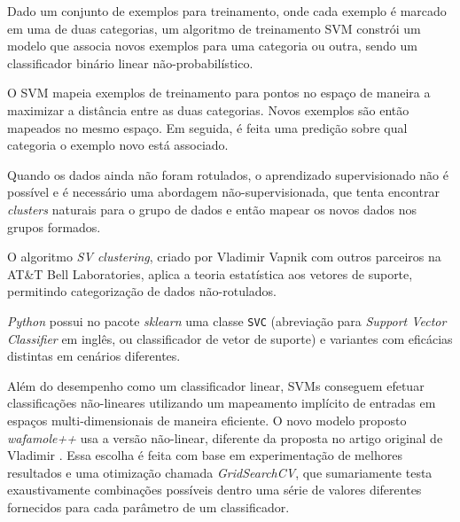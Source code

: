 Dado um conjunto de exemplos para treinamento, onde cada exemplo é marcado em uma de duas categorias, um algoritmo de treinamento SVM constrói um modelo que associa novos exemplos para uma categoria ou outra, sendo um classificador binário linear não-probabilístico. 
 
O SVM mapeia exemplos de treinamento para pontos no espaço de maneira a maximizar a distância entre as duas categorias. Novos exemplos são então mapeados no mesmo espaço. Em seguida, é feita uma predição sobre qual categoria o exemplo novo está associado.

Quando os dados ainda não foram rotulados, o aprendizado supervisionado não é possível e é necessário uma abordagem não-supervisionada, que tenta encontrar \textit{clusters} naturais para o grupo de dados e então mapear os novos dados nos grupos formados. 

O algoritmo \textit{SV clustering}, criado por Vladimir Vapnik \cite{ben2001_vapnik_support} com
outros parceiros na AT\&T Bell Laboratories, aplica a teoria estatística aos vetores de suporte, permitindo categorização de dados não-rotulados.


\textit{Python} possui no pacote \textit{sklearn} uma classe \verb+SVC+ (abreviação para \textit{Support Vector Classifier} em inglês, ou classificador de vetor de suporte) e variantes com eficácias distintas em cenários diferentes.

Além do desempenho como um classificador linear, SVMs conseguem efetuar classificações não-lineares utilizando um mapeamento implícito de entradas em espaços multi-dimensionais de maneira eficiente. O novo modelo proposto \textit{wafamole++} usa a versão não-linear, diferente da proposta no artigo original de Vladimir \cite{ben2001_vapnik_support}. Essa escolha é feita com base em experimentação de melhores resultados e uma otimização chamada \textit{GridSearchCV}, que sumariamente testa exaustivamente combinações possíveis dentro uma série de valores diferentes fornecidos para cada parâmetro de um classificador. 

